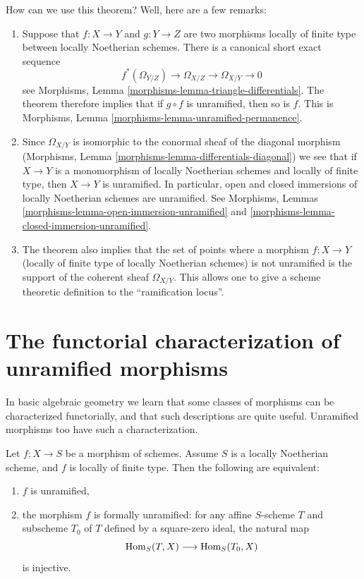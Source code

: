 \noindent
How can we use this theorem? Well, here are a few remarks:
\begin{enumerate}
\item Suppose that
$f : X \to Y$ and $g : Y \to Z$ are two morphisms locally of finite
type between locally Noetherian schemes. There is a canonical short
exact sequence
$$
f^*(\Omega_{Y/Z}) \to \Omega_{X/Z} \to \Omega_{X/Y} \to 0
$$
see Morphisms, Lemma \ref{morphisms-lemma-triangle-differentials}.
The theorem therefore implies that if $g \circ f$ is unramified,
then so is $f$. This is
Morphisms, Lemma \ref{morphisms-lemma-unramified-permanence}.
\item Since $\Omega_{X/Y}$ is isomorphic to the conormal sheaf
of the diagonal morphism
(Morphisms, Lemma \ref{morphisms-lemma-differentials-diagonal})
we see that if $X \to Y$ is a monomorphism of
locally Noetherian schemes and locally of finite type,
then $X \to Y$ is unramified.
In particular, open and closed immersions of locally Noetherian schemes
are unramified. See
Morphisms, Lemmas
\ref{morphisms-lemma-open-immersion-unramified} and
\ref{morphisms-lemma-closed-immersion-unramified}.
\item The theorem also implies that the set of points
where a morphism $f : X \to Y$ (locally of finite type of locally Noetherian
schemes) is not unramified is
the support of the coherent sheaf $\Omega_{X/Y}$.
This allows one to give a scheme theoretic definition to the
``ramification locus''.
\end{enumerate}

\section{The functorial characterization of unramified morphisms}
\label{section-functorial-unramified}

\noindent
In basic algebraic geometry we learn that some classes of morphisms can be
characterized functorially, and that such descriptions are quite useful.
Unramified morphisms too have such a characterization.

\begin{theorem}
\label{theorem-formally-unramified}
Let $f : X \to S$ be a morphism of schemes.
Assume $S$ is a locally Noetherian scheme, and $f$ is locally of finite type.
Then the following are equivalent:
\begin{enumerate}
\item $f$ is unramified,
\item the morphism $f$ is formally unramified:
for any affine $S$-scheme $T$ and subscheme $T_0$ of $T$
defined by a square-zero ideal,
the natural map
$$
\mathop{\mathrm{Hom}}\nolimits_S(T, X) \longrightarrow \mathop{\mathrm{Hom}}\nolimits_S(T_0, X)
$$
is injective.
\end{enumerate}
\end{theorem}

